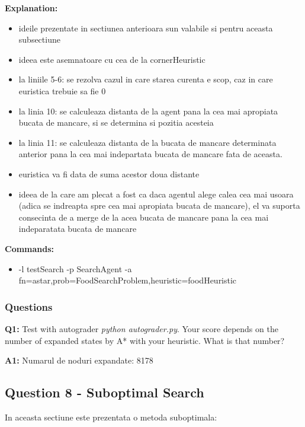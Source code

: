 \textbf{Explanation:}
\begin{itemize}
    \setlength\itemsep{0em}
    \item ideile prezentate in sectiunea anterioara sun valabile si pentru aceasta subsectiune
    \item ideea este asemnatoare cu cea de la cornerHeuristic
    \item la liniile 5-6: se rezolva cazul in care starea curenta e scop, caz in care euristica trebuie sa fie 0
    \item la linia 10: se calculeaza distanta de la agent pana la cea mai apropiata bucata de mancare, si se determina si pozitia acesteia
    \item la linia 11: se calculeaza distanta de la bucata de mancare determinata anterior pana la cea mai indepartata bucata de mancare fata de aceasta. 
    \item euristica va fi data de suma acestor doua distante
    \item ideea de la care am plecat a fost ca daca agentul alege calea cea mai usoara (adica se indreapta spre cea mai apropiata bucata de mancare), el va suporta consecinta de a merge de la acea bucata de mancare pana la cea mai indeparatata bucata de mancare
\end{itemize}


\textbf{Commands:}
\begin{itemize}
    \setlength\itemsep{0em}
    \item -l testSearch -p SearchAgent -a fn=astar,prob=FoodSearchProblem,heuristic=foodHeuristic
\end{itemize}

\subsubsection{Questions}

\textbf{Q1:} Test  with  autograder \textit{python autograder.py}. Your score depends on the number of expanded states by A* with your heuristic. What is that number?

\textbf{A1:} Numarul de noduri expandate: 8178





\subsection{Question 8 - Suboptimal Search}
In aceasta sectiune este prezentata o metoda suboptimala:\newline


